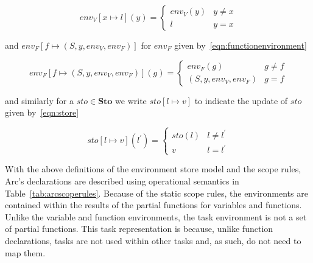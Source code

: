 \begin{equation}\label{eqn:variableenvironment}
    env_V[x \mapsto l](y) =
    \begin{cases}
        env_V(y) & y \neq x \\
        l        & y = x
    \end{cases}
\end{equation}


\noindent and $env_F[ f \mapsto (S, y, env_V, env_F)]$ for $env_F$ given by~\ref{eqn:functionenvironment}


\begin{equation}\label{eqn:functionenvironment}
    env_F[f \mapsto (S, y, env_V, env_F)](g) =
    \begin{cases}
        env_F(g)             & g \neq f \\
        (S, y, env_V, env_F) & g = f
    \end{cases}
\end{equation}


\noindent and similarly for a $sto \in \textbf{Sto}$ we write $sto[ l \mapsto v ]$ to indicate the update of $sto$ given by~\ref{eqn:store}


\begin{equation}\label{eqn:store}
    sto[l \mapsto v](l^\prime) =
    \begin{cases}
        sto(l) & l \neq l^\prime \\
        v      & l = l^\prime
    \end{cases}
\end{equation}


With the above definitions of the environment store model and the scope rules, Arc's declarations are described using operational semantics in Table~\ref{tab:arcscoperules}. Because of the static scope rules, the environments are contained within the results of the partial functions for variables and functions. Unlike the variable and function environments, the task environment is not a set of partial functions. This task representation is because, unlike function declarations, tasks are not used within other tasks and, as such, do not need to map them.


